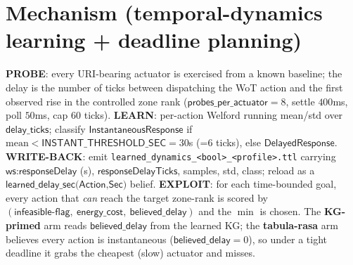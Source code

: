 \documentclass[10pt,a4paper]{article}
\newcommand{\file}[1]{\texttt{\small #1}}
\newcommand{\kw}[1]{\textbf{#1}}
\begin{document}
\begin{center}
\end{center}

\section{Mechanism (temporal-dynamics learning + deadline planning)}
\kw{PROBE}: every URI-bearing actuator is exercised from a known baseline; the delay is the number of
ticks between dispatching the WoT action and the first observed rise in the controlled zone rank
(\(\textsf{probes\_per\_actuator}=8\), settle \(400\)ms, poll \(50\)ms, cap \(60\) ticks).
\kw{LEARN}: per-action Welford running mean/std over \(\textsf{delay\_ticks}\); classify
\(\textsf{InstantaneousResponse}\) if \(\text{mean}<\textsf{INSTANT\_THRESHOLD\_SEC}=30\)s (=\(6\) ticks), else
\(\textsf{DelayedResponse}\). \kw{WRITE-BACK}: emit \file{learned\_dynamics\_<bool>\_<profile>.ttl} carrying
\(\textsf{ws:responseDelay}\) (s), \(\textsf{responseDelayTicks}\), samples, std, class; reload as a
\(\textsf{learned\_delay\_sec(Action,Sec)}\) belief. \kw{EXPLOIT}: for each time-bounded goal, every action
that \emph{can} reach the target zone-rank is scored by
\((\textsf{infeasible-flag},\ \textsf{energy\_cost},\ \textsf{believed\_delay})\) and the \(\min\) is chosen.
The \kw{KG-primed} arm reads \(\textsf{believed\_delay}\) from the learned KG; the \kw{tabula-rasa} arm
believes every action is instantaneous (\(\textsf{believed\_delay}=0\)), so under a tight deadline it grabs
the cheapest (slow) actuator and misses.
\end{document}
